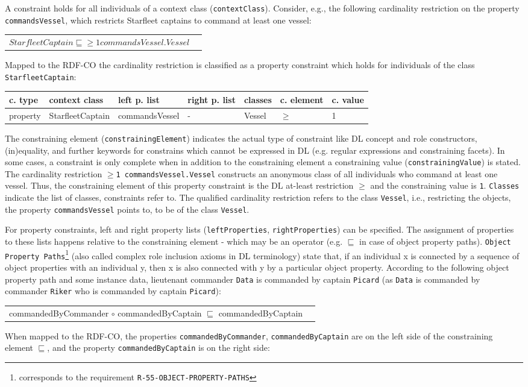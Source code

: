 \documentclass{llncs}
\newcommand{\ms}[1]{\texttt{#1}}
\newenvironment{gcotable}{
  \scriptsize
  \sffamily
  \vspace{0cm}
	\begin{center}
  \begin{tabular}{l|l|l|l|l|l|l}
  \hline
  \textbf{c. type} & \textbf{context class} & \textbf{left p. list} & \textbf{right p. list} & \textbf{classes} & \textbf{c. element} & \textbf{c. value} \\
  \hline

}{
  \hline
  \end{tabular}
	\end{center}
}
\newenvironment{DL}{
  \vspace{0cm}
	\begin{center}
  \begin{tabular}{r l}

}{
  \end{tabular}
	\end{center}
}
\begin{document}
A constraint holds for all individuals of a context class (\ms{contextClass}).
Consider, e.g., the following cardinality restriction on the property \ms{commandsVessel}, which restricts Starfleet captains to command at least one vessel: 
\begin{DL}
$StarfleetCaptain \sqsubseteq \geq1 commandsVessel . Vessel $
\end{DL}
Mapped to the RDF-CO the cardinality restriction is classified as a property constraint which holds for individuals of the class \ms{StarfleetCaptain}:
\begin{gcotable}
property & StarfleetCaptain & commandsVessel & - & Vessel & $\geq$ & 1 \\
\end{gcotable}
The constraining element (\ms{constrainingElement}) indicates the actual type of constraint like DL concept and role constructors, (in)equality, and further keywords for constrains which cannot be expressed in DL (e.g. regular expressions and constraining facets).
In some cases, a constraint is only complete when in addition to the constraining element a constraining value (\ms{constrainingValue}) is stated.
The cardinality restriction 
\ms{$\geq$1 commandsVessel.Vessel}
constructs an anonymous class of all individuals who command at least one vessel.
Thus, the constraining element of this property constraint is the DL at-least restriction \ms{$\geq$} and the constraining value is \ms{1}.
\ms{Classes} indicate the list of classes, constraints refer to.
The qualified cardinality restriction refers to the class \ms{Vessel}, 
i.e., restricting the objects, the property \ms{commandsVessel} points to, to be of the class \ms{Vessel}.

For property constraints, left and right property lists (\ms{leftProperties}, \ms{rightProperties}) can be specified.
The assignment of properties to these lists happens relative to the constraining element - which may be an operator (e.g. $\sqsubseteq$ in case of object property paths).
\ms{Object Property Paths}\footnote{corresponds to the requirement \ms{R-55-OBJECT-PROPERTY-PATHS}} (also called complex role inclusion axioms in DL terminology)
state that, if an individual x is connected by a sequence of object properties with an individual y, 
then x is also connected with y by a particular object property. 
According to the following object property path and some instance data, lieutenant commander \ms{Data} is commanded by captain \ms{Picard} 
(as \ms{Data} is commanded by commander \ms{Riker} who is commanded by captain \ms{Picard}):
\begin{DL}
commandedByCommander $\circ$ commandedByCaptain $\sqsubseteq$ commandedByCaptain 
\end{DL}
When mapped to the RDF-CO, the properties \ms{commandedByCommander}, \ms{commandedByCaptain} are on the left side of the constraining element \ms{$\sqsubseteq$},
and the property \ms{commandedByCaptain} is on the right side:
\end{document}
